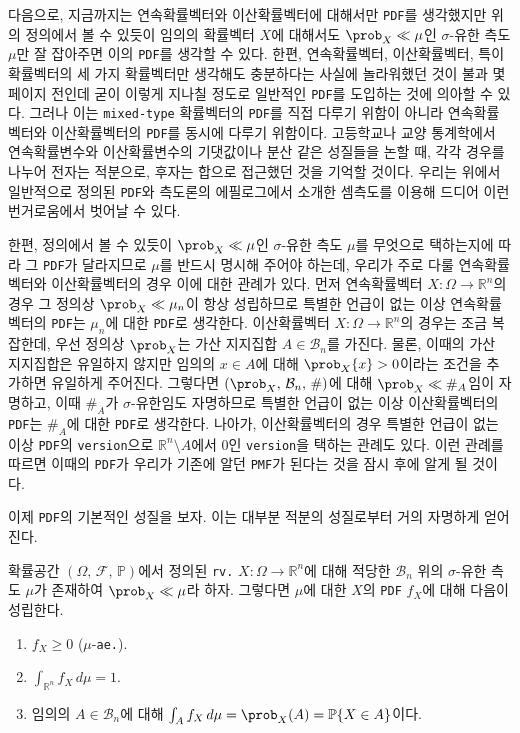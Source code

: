 다음으로, 지금까지는 연속확률벡터와 이산확률벡터에 대해서만 \texttt{PDF}를 생각했지만 위의 정의에서 볼 수 있듯이 임의의 확률벡터 $X$에 대해서도 $\prob_X\ll\mu$인 $\sigma$-유한 측도 $\mu$만 잘 잡아주면 이의 \texttt{PDF}를 생각할 수 있다. 한편, 연속확률벡터, 이산확률벡터, 특이확률벡터의 세 가지 확률벡터만 생각해도 충분하다는 사실에 놀라워했던 것이 불과 몇 페이지 전인데 굳이 이렇게 지나칠 정도로 일반적인 \texttt{PDF}를 도입하는 것에 의아할 수 있다. 그러나 이는 \texttt{mixed-type} 확률벡터의 \texttt{PDF}를 직접 다루기 위함이 아니라 연속확률벡터와 이산확률벡터의 \texttt{PDF}를 동시에 다루기 위함이다. 고등학교나 교양 통계학에서 연속확률변수와 이산확률변수의 기댓값이나 분산 같은 성질들을 논할 때, 각각 경우를 나누어 전자는 적분으로, 후자는 합으로 접근했던 것을 기억할 것이다. 우리는 위에서 일반적으로 정의된 \texttt{PDF}와 측도론의 에필로그에서 소개한 셈측도를 이용해 드디어 이런 번거로움에서 벗어날 수 있다.

한편, 정의에서 볼 수 있듯이 $\prob_X\ll\mu$인 $\sigma$-유한 측도 $\mu$를 무엇으로 택하는지에 따라 그 \texttt{PDF}가 달라지므로 $\mu$를 반드시 명시해 주어야 하는데, 우리가 주로 다룰 연속확률벡터와 이산확률벡터의 경우 이에 대한 관례가 있다. 먼저 연속확률벡터 $X:\Omega\to\mathbb{R}^n$의 경우 그 정의상 $\prob_X\ll\mu_n$이 항상 성립하므로 특별한 언급이 없는 이상 연속확률벡터의 \texttt{PDF}는 $\mu_n$에 대한 \texttt{PDF}로 생각한다. 이산확률벡터 $X:\Omega\to\mathbb{R}^n$의 경우는 조금 복잡한데, 우선 정의상 $\prob_X$는 가산 지지집합 $A\in\mathcal{B}_n$를 가진다. 물론, 이때의 가산 지지집합은 유일하지 않지만 임의의 $x\in A$에 대해 $\prob_X\{x\}>0$이라는 조건을 추가하면 유일하게 주어진다. 그렇다면 $(\prob_X,\,\mathcal{B}_n,\,\#)$에 대해 $\prob_X\ll\#_A$임이 자명하고, 이때 $\#_A$가 $\sigma$-유한임도 자명하므로 특별한 언급이 없는 이상 이산확률벡터의 \texttt{PDF}는 $\#_A$에 대한 \texttt{PDF}로 생각한다. 나아가, 이산확률벡터의 경우 특별한 언급이 없는 이상 \texttt{PDF}의 \texttt{version}으로 $\mathbb{R}^n\setminus A$에서 $0$인 \texttt{version}을 택하는 관례도 있다. 이런 관례를 따르면 이때의 \texttt{PDF}가 우리가 기존에 알던 \texttt{PMF}가 된다는 것을 잠시 후에 알게 될 것이다.

이제 \texttt{PDF}의 기본적인 성질을 보자. 이는 대부분 적분의 성질로부터 거의 자명하게 얻어진다.

\begin{theorem}\label{thm:PDFProp}
    확률공간 $(\Omega,\,\mathcal{F},\,\mathbb{P})$에서 정의된 \texttt{rv.} $X:\Omega\to\mathbb{R}^n$에 대해 적당한 $\mathcal{B}_n$ 위의 $\sigma$-유한 측도 $\mu$가 존재하여 $\prob_X\ll\mu$라 하자. 그렇다면 $\mu$에 대한 $X$의 \texttt{PDF} $f_X$에 대해 다음이 성립한다.
    \begin{enumerate}
        \item $f_X\geq0$ ($\mu$-\texttt{ae.}).
        \item $\int_{\mathbb{R}^n}f_X\,d\mu=1$.
        \item 임의의 $A\in\mathcal{B}_n$에 대해 $\int_Af_X\,d\mu=\prob_X(A)=\mathbb{P}\{X\in A\}$이다.
    \end{enumerate}
\end{theorem}

